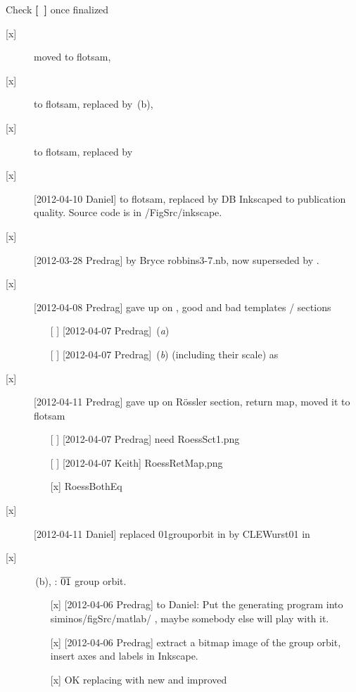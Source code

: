 Check {\bf [~]} once finalized
\begin{description}

\item[{[x]}] moved  to flotsam,
\item[{[x]}]  to flotsam, replaced by \,(b),
\item[{[x]}]  to flotsam, replaced by 
\item[{[x]}] [2012-04-10 Daniel]   to flotsam, replaced by
             DB Inkscaped  to
             publication quality. Source code is in /FigSrc/inkscape.

\item[{[x]}] [2012-03-28 Predrag]
         by Bryce robbins3-7.nb, now superseded by
        .

\item[{[x]}] [2012-04-08 Predrag] gave up on ,
    good and bad templates / sections
    \begin{itemize}
        \item[{[ ]}] [2012-04-07 Predrag] \,({\it a})
        \item[{[ ]}] [2012-04-07 Predrag] \,({\it b})
            (including their scale) as
    \end{itemize}

\item[{[x]}] [2012-04-11 Predrag]  gave up on 
    R\"ossler section, return map, moved it to flotsam
    \begin{itemize}
        \item[{[ ]}] [2012-04-07 Predrag] need {RoessSct1}.png
        \item[{[ ]}] [2012-04-07 Keith] {RoessRetMap},png
        \item[{[x]}]  RoessBothEq
    \end{itemize}

\item[{[x]}] [2012-04-11 Daniel]  replaced {01grouporbit} in
    by CLEWurst01 in 

\item[{[x]}] \,(b), \CLf: $\overline{01}$ {\rpo} group orbit.
    \begin{itemize}
        \item[{[x]}]  [2012-04-06 Predrag] to Daniel:
            Put the generating program into siminos/figSrc/matlab/ , maybe
            somebody else will play with it.
        \item[{[x]}]  [2012-04-06 Predrag] extract a bitmap image of the
            group orbit, insert axes and labels in Inkscape.
        \item[{[x]}] OK replacing  with new and
            improved 
		\end{itemize}

\end{description}
\newpage

